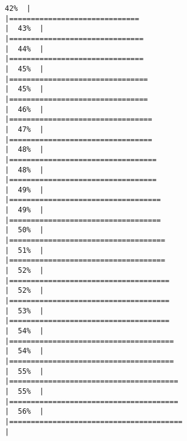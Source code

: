 \documentclass[
]{book}
\begin{document}
\begin{verbatim}
42%  |                                                                              |==============================                                        |  43%  |                                                                              |===============================                                       |  44%  |                                                                              |===============================                                       |  45%  |                                                                              |================================                                      |  45%  |                                                                              |================================                                      |  46%  |                                                                              |=================================                                     |  47%  |                                                                              |=================================                                     |  48%  |                                                                              |==================================                                    |  48%  |                                                                              |==================================                                    |  49%  |                                                                              |===================================                                   |  49%  |                                                                              |===================================                                   |  50%  |                                                                              |====================================                                  |  51%  |                                                                              |====================================                                  |  52%  |                                                                              |=====================================                                 |  52%  |                                                                              |=====================================                                 |  53%  |                                                                              |=====================================                                 |  54%  |                                                                              |======================================                                |  54%  |                                                                              |======================================                                |  55%  |                                                                              |=======================================                               |  55%  |                                                                              |=======================================                               |  56%  |                                                                              |========================================                              |  
\end{verbatim}
\end{document}
